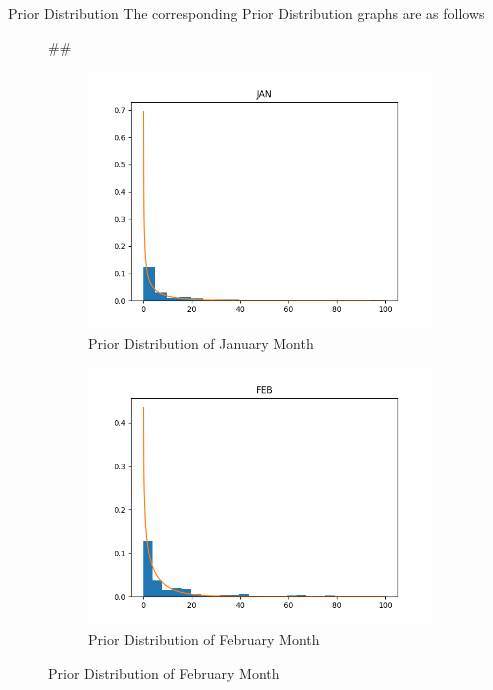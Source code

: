 \documentclass{beamer}
\newenvironment{subcolumns}[1]
 {\valign\bgroup\hsize=#1##\cr}
 {\crcr\egroup}
\newcommand{\nextsubcolumn} {\cr\noalign{\hfill}}
\begin{document}
\begin{frame}{Prior Distribution}
The corresponding Prior Distribution graphs are as follows
\begin{figure}[htp]
\centering
\begin{subcolumns}{0.50\columnwidth}
\begin{subfigure}{0.50\columnwidth}
\centering
\includegraphics[width=\textwidth]{Images/PriorJAN.png}
\caption{Prior Distribution of January Month}
\end{subfigure}
\nextsubcolumn
\begin{subfigure}{0.5\columnwidth}
\centering
\includegraphics[width=\textwidth]{Images/PriorFEB.png}
\caption{Prior Distribution of February Month}
\end{subfigure}
\end{subcolumns}
\end{figure}
\end{frame}
\end{document}
